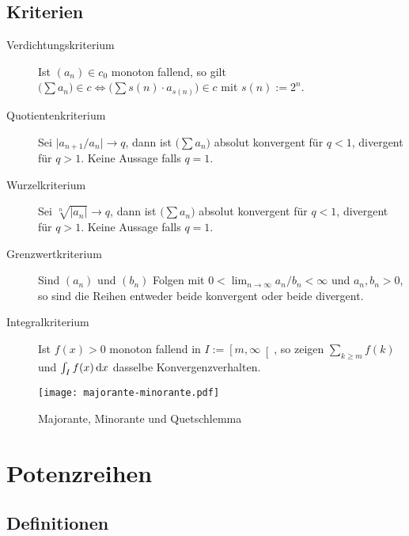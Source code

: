 \subsection{Kriterien}
\begin{description}
  \item [{Verdichtungskriterium}] 
	Ist $(a_n) \in c_0$ monoton fallend, so gilt $\bigl( \sum a_n \bigr) \in c \Leftrightarrow \bigl( \sum s(n) \cdot a_{s(n)} \bigr) \in c$ mit $s(n):=2^n$.
  \item [{Quotientenkriterium}] 
	Sei $\lvert a_{n+1} / a_n \rvert \to q$, dann ist $\bigl( \sum a_n \bigr)$ absolut konvergent für $q<1$, divergent für $q>1$.
	Keine Aussage falls $q=1$.
  \item [{Wurzelkriterium}] 
	Sei $\sqrt[n]{\lvert a_n \rvert} \to q$, dann ist $\bigl( \sum a_n \bigr)$ absolut konvergent für $q<1$, divergent für $q>1$.
	Keine Aussage falls $q=1$.
  \item [{Grenzwertkriterium}] 
	Sind $(a_n)$ und $(b_n)$ Folgen mit $0<\lim_{n\rightarrow\infty} a_n/b_n<\infty$ und $a_n, b_n>0$, so sind die Reihen entweder beide konvergent oder beide divergent.
  \item [{Integralkriterium}] 
	Ist $f(x)>0$ monoton fallend in $I:=\left[m,\infty\right[$, so zeigen $\sum_{k\geq m} f(k)$ und $\int_I f(x) \,\mathrm{d} x$ dasselbe Konvergenzverhalten.
\end{description}

\begin{figure}[H]
\centering
\texttt{[image: majorante-minorante.pdf]}

\caption{Majorante, Minorante und Quetschlemma}
\end{figure}

\section{Potenzreihen}


\subsection{Definitionen}

